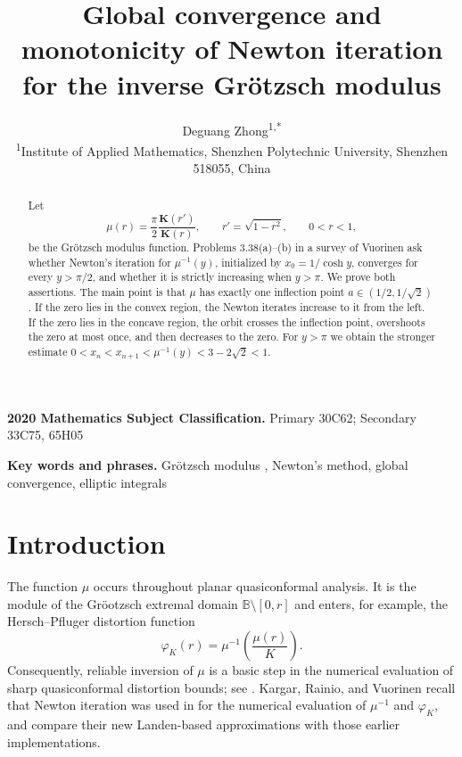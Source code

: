 \documentclass[11pt]{article}
\title{Global convergence and monotonicity of Newton iteration
for the inverse Gr\"otzsch modulus}
\author{Deguang Zhong\textsuperscript{1,*}\\
\quad
\small\textsuperscript{1}Institute of Applied Mathematics, Shenzhen Polytechnic University,
Shenzhen 518055,  China
}
\date{}
\theoremstyle{remark}
\newcommand{\Kc}{\mathbf K}
\begin{document}
\maketitle

\begin{abstract}
Let
\[
 \mu(r)=\frac{\pi}{2}\frac{\Kc(r')}{\Kc(r)},
 \qquad r'=\sqrt{1-r^2},\qquad 0<r<1,
\]
be the Gr\"otzsch modulus function.  Problems 3.38(a)--(b) in a survey of
Vuorinen ask whether Newton's iteration for $\mu^{-1}(y)$, initialized by
$x_0=1/\cosh y$, converges for every $y>\pi/2$, and whether it is strictly
increasing when $y>\pi$.  We prove both assertions.  The main point is that
$\mu$ has exactly one inflection point $a\in(1/2,1/\sqrt2)$.  If the zero lies
in the convex region, the Newton iterates increase to it from the left.  If
the zero lies in the concave region, the orbit crosses the inflection point,
overshoots the zero at most once, and then decreases to the zero.  For
$y>\pi$ we obtain the stronger estimate $0<x_n<x_{n+1}<\mu^{-1}(y)<3-2\sqrt2<1.$
\end{abstract}
\medskip
\noindent\textbf{2020 Mathematics Subject Classification.}
Primary 30C62; Secondary 33C75, 65H05

\smallskip
\noindent\textbf{Key words and phrases.}
 Gr\"{o}tzsch modulus , Newton's method,  global convergence, elliptic integrals
\section{Introduction}

The function $\mu$ occurs throughout planar quasiconformal analysis.  It is the module of the Gr\"{o}otzsch extremal domain $\mathbb{B}\setminus[0,r]$ and enters, for example, the
Hersch--Pfluger distortion function \cite{AVV1988,  HP52, LV73}
\[
 \varphi_K(r)=\mu^{-1}\!\left(\frac{\mu(r)}{K}\right).
\]
Consequently, reliable inversion of $\mu$ is a basic step in the numerical
evaluation of sharp quasiconformal distortion bounds; see
\cite{AVVbook, AQVV2000, VuorinenSurvey}.  Kargar, Rainio, and Vuorinen \cite[Sections~1 and~3]{KRV2024}
recall that Newton iteration was used in \cite{AVVbook} for the
numerical evaluation of \(\mu^{-1}\) and \(\varphi_K\), and compare
their new Landen-based approximations with those earlier
implementations.
\end{document}
